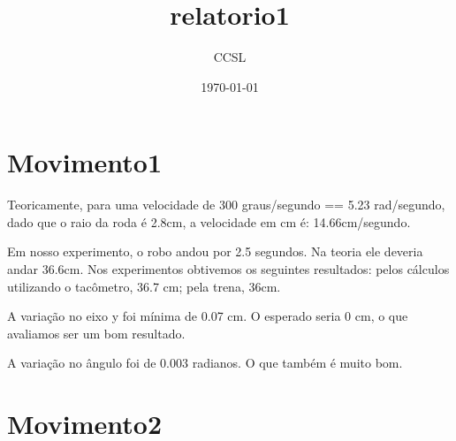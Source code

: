 \documentclass[11pt]{article}
\title{relatorio1}
\author{CCSL}
\date{\today}
\begin{document}
\maketitle

\setcounter{tocdepth}{3}
\tableofcontents
\vspace*{1cm}

\section{Movimento1}
\label{sec-1}


Teoricamente, para uma velocidade de 300 graus/segundo == 5.23 rad/segundo, dado que o raio da roda é 2.8cm, a velocidade em cm é: 14.66cm/segundo. 

Em nosso experimento, o robo andou por 2.5 segundos. Na teoria ele deveria andar 36.6cm. Nos experimentos obtivemos os seguintes resultados:
pelos cálculos utilizando o tacômetro, 36.7 cm; pela trena, 36cm.

A variação no eixo y foi mínima de 0.07 cm. O esperado seria
0 cm, o que avaliamos ser um bom resultado.

A variação no ângulo foi de 0.003 radianos. O que também é muito bom.
\section{Movimento2}
\label{sec-2}
\end{document}
